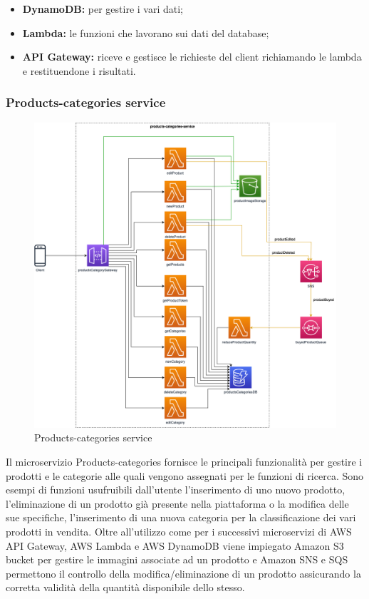 \begin{itemize}
	\item \textbf{DynamoDB:} per gestire i vari dati;
	\item \textbf{Lambda:} le funzioni che lavorano sui dati del database;
	\item \textbf{API Gateway:} riceve e gestisce le richieste del client richiamando le lambda e restituendone i risultati.
\end{itemize}

\subsubsection{Products-categories service}
\begin{figure}[H]
	\centering
	\includegraphics[scale=0.4]{Immagini/Backend/AWSProductsCategories.png}
	\caption{Products-categories service}
	\label{fig:ProductCategories}
\end{figure}
Il microservizio Products-categories fornisce le principali funzionalità per gestire i prodotti e le categorie alle quali vengono assegnati per le funzioni di ricerca. Sono esempi di funzioni usufruibili dall'utente l'inserimento di uno nuovo prodotto, l'eliminazione di un prodotto già presente nella piattaforma o la modifica delle sue specifiche, l'inserimento di una nuova categoria per la classificazione dei vari prodotti in vendita. Oltre all'utilizzo come per i successivi microservizi di AWS API Gateway, AWS Lambda e AWS DynamoDB viene impiegato Amazon S3 bucket per gestire le immagini associate ad un prodotto e Amazon SNS e SQS permettono il controllo della modifica/eliminazione di un prodotto assicurando la corretta validità della quantità disponibile dello stesso.

